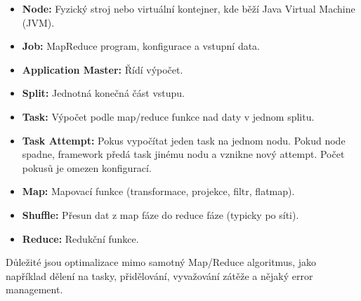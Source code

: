 
\begin{itemize}
  \item \textbf{Node:} Fyzický stroj nebo virtuální kontejner, kde běží Java Virtual Machine (JVM).
  \item \textbf{Job:} MapReduce program, konfigurace a vstupní data.
  \item \textbf{Application Master:} Řídí výpočet.
  \item \textbf{Split:} Jednotná konečná část vstupu.
  \item \textbf{Task:} Výpočet podle map/reduce funkce nad daty v jednom splitu.
  \item \textbf{Task Attempt:} Pokus vypočítat jeden task na jednom nodu. Pokud node spadne, framework předá task jinému nodu a vznikne nový attempt. Počet pokusů je omezen konfigurací.
  \item \textbf{Map:} Mapovací funkce (transformace, projekce, filtr, flatmap).
  \item \textbf{Shuffle:} Přesun dat z map fáze do reduce fáze (typicky po síti).
  \item \textbf{Reduce:} Redukční funkce.
\end{itemize}

Důležité jsou optimalizace mimo samotný Map/Reduce algoritmus, jako například dělení na tasky, přidělování, vyvažování zátěže a nějaký error management.
